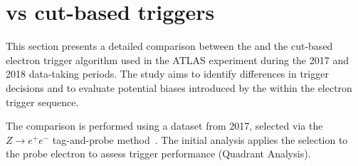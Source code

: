 
\section{\rnn{} vs cut-based triggers}%
\label{sec:off_ana}


This section presents a detailed comparison between the \rnn{} and the cut-based electron trigger algorithm used in the ATLAS experiment during the 2017 and 2018 data-taking periods. The study aims to identify differences in trigger decisions and to evaluate potential biases introduced by the \rnn{} within the electron trigger sequence.

The comparison is performed using a dataset from 2017, selected via the $Z\rightarrow e^+e^-$ tag-and-probe method~\cite{TRIG-2018-05}. The initial analysis applies the \rnn{} selection to the probe electron to assess trigger performance (Quadrant Analysis).

